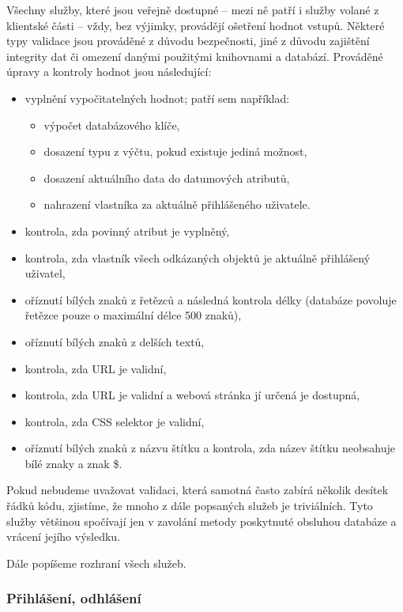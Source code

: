 Všechny služby, které jsou veřejně dostupné -- mezi ně patří i služby volané z klientské části -- vždy, bez výjimky, provádějí ošetření hodnot vstupů.
Některé typy validace jsou prováděné z důvodu bezpečnosti, jiné z důvodu zajištění integrity dat či omezení danými použitými knihovnami a databází.
Prováděné úpravy a kontroly hodnot jsou následující:
\begin{itemize}
	\item vyplnění vypočitatelných hodnot; patří sem například:
		\begin{itemize}
			\item výpočet databázového klíče,
			\item dosazení typu z výčtu, pokud existuje jediná možnost,
			\item dosazení aktuálního data do datumových atributů,
			\item nahrazení vlastníka za aktuálně přihlášeného uživatele.
		\end{itemize}
	\item kontrola, zda povinný atribut je vyplněný,
	\item kontrola, zda vlastník všech odkázaných objektů je aktuálně přihlášený uživatel,
	\item oříznutí bílých znaků z řetězců a následná kontrola délky (databáze povoluje řetězce pouze o maximální délce 500 znaků),
	\item oříznutí bílých znaků z delších textů,
	\item kontrola, zda URL je validní,
	\item kontrola, zda URL je validní a webová stránka jí určená je dostupná,
	\item kontrola, zda CSS selektor je validní,
	\item oříznutí bílých znaků z názvu štítku a kontrola, zda název štítku neobsahuje bílé znaky a znak \$.
\end{itemize}

Pokud nebudeme uvažovat validaci, která samotná často zabírá několik desítek řádků kódu, zjistíme, že mnoho z dále popsaných služeb je triviálních.
Tyto služby většinou spočívají jen v zavolání metody poskytnuté obsluhou databáze a vrácení jejího výsledku.

\bigskip
Dále popíšeme rozhraní všech služeb.

\subsubsection{Přihlášení, odhlášení}


